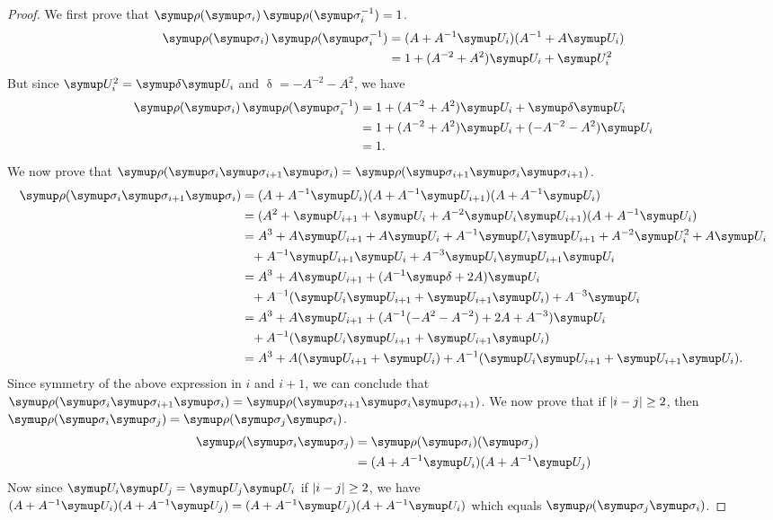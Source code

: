 \begin{proof}
	We first prove that \(\uprhoo(\sigmaa_i)\uprhoo(\sigmaa_i^{-1}) = 1\).
	\begin{align*}
		\uprhoo(\sigmaa_i)\uprhoo(\sigmaa_i^{-1}) &= (A + A^{-1}\U_i)(A^{-1} + A\U_i)\\
		&= 1 + (A^{-2} + A^2)\U_i + \U_i^2\\
	\end{align*}
	But since \(\U_i^2 = \updelta \U_i\) and \(\updelta = -A^{-2} - A^{2}\), we have
	\begin{align*}
		\uprhoo(\sigmaa_i)\uprhoo(\sigmaa_i^{-1}) &= 1 + (A^{-2} + A^2)\U_i + \updelta\U_i\\
		&= 1 + (A^{-2} + A^2) \U_i + (-A^{-2} - A^{2})\U_i\\
		&= 1.
	\end{align*}
	We now prove that \(\uprhoo(\sigmaa_i \sigmaa_{i+1} \sigmaa_i) = \uprhoo(\sigmaa_{i+1} \sigmaa_i \sigmaa_{i+1})\).
	\begin{align*}
		\uprhoo(\sigmaa_i \sigmaa_{i+1} \sigmaa_i) &= (A + A^{-1}\U_i)(A + A^{-1}\U_{i+1})(A + A^{-1}\U_i)\\
		&= (A^2 + \U_{i+1} + \U_i + A^{-2}\U_i\U_{i+1})(A + A^{-1}\U_i)\\
		&= A^3 + A\U_{i+1} + A\U_i + A^{-1}\U_i\U_{i+1} + A^{-2}\U_i^2 + A\U_i\\
		&\phantom{=} + A^{-1}\U_{i+1}\U_i + A^{-3}\U_i\U_{i+1}\U_i\\
		&= A^3 + A\U_{i+1} + (A^{-1}\updelta + 2A)\U_i\\
		&\phantom{=} + A^{-1}(\U_i\U_{i+1} + \U_{i+1}\U_i) + A^{-3}\U_i\\
		&= A^3 + A\U_{i+1} + (A^{-1}(-A^2 - A^{-2}) + 2A + A^{-3})\U_i\\
		&\phantom{=}+ A^{-1}(\U_i\U_{i+1} + \U_{i+1}\U_i)\\
		&= A^3 + A(\U_{i+1} + \U_i) + A^{-1}(\U_i\U_{i+1} + \U_{i+1}\U_i).
	\end{align*}
	Since symmetry of the above expression in \(i\) and \(i+1\), we can conclude that \(\uprhoo(\sigmaa_i \sigmaa_{i+1} \sigmaa_i) = \uprhoo(\sigmaa_{i+1} \sigmaa_i \sigmaa_{i+1})\).
	We now prove that if  \(\lvert i-j\rvert \geq 2\), then \(\uprhoo(\sigmaa_i\sigmaa_j) = \uprhoo(\sigmaa_j\sigmaa_i)\).
	\begin{align*}
		\uprhoo(\sigmaa_i\sigmaa_j) &= \uprhoo(\sigmaa_i)(\sigmaa_j)\\
		&= (A + A^{-1}\U_i)(A + A^{-1}\U_j)
	\end{align*}
	Now since \(\U_i\U_j = \U_j\U_i\) if \(\lvert i-j\rvert \geq 2\), we have \((A + A^{-1}\U_i)(A + A^{-1}\U_j) = (A + A^{-1}\U_j)(A + A^{-1}\U_i)\) which equals \(\uprhoo(\sigmaa_j\sigmaa_i)\).
\end{proof}

